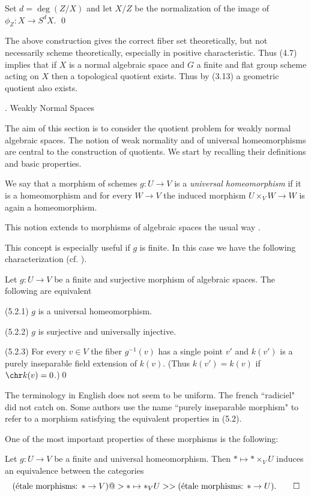 \demop Set  $d=\deg (Z/X)$ and let $X/Z$ be the normalization of the image of
$\phi_Z:X\to S^d X$. \qed\enddemo

 The above construction gives the correct fiber set
theoretically, but not necessarily scheme theoretically, especially in
positive characteristic. Thus (4.7) implies that if $X$ is a normal algebraic
space and $G$ a finite and flat group scheme acting on $X$ then a topological
quotient exists. Thus  by (3.13) a geometric quotient also exists.
\enddemo


. Weakly Normal Spaces
\endhead


The aim of this section is to consider the quotient problem for weakly normal
algebraic spaces. The notion of weak normality and of universal
homeomorphisms are central to the construction of quotients.  We start by
recalling their definitions and  basic properties.



 We say that a morphism of schemes $g:U\to V$ is a {\it
universal homeomorphism} if  it is a homeomorphism and for every $W\to V$ the
induced morphism $U\times_VW\to W$ is again a homeomorphism.

This notion extends to morphisms of algebraic spaces the usual way
\cite{Knutson71, II.3}.
\enddemo

This concept is especially useful if $g$ is finite. In this case we have the
following   characterization (cf.
\cite{EGA71, I.3.7--8}).

  Let $g:U\to V$ be a finite and surjective morphism of
algebraic spaces. The following are equivalent

(5.2.1) $g$ is  a universal homeomorphism.

(5.2.2) $g$ is surjective and universally injective.

(5.2.3) For every $v\in V$ the fiber  $g^{-1}(v)$ has a single
point $v'$ and
$k(v')$ is a purely inseparable field extension of   $k(v)$.
(Thus $k(v')=k(v)$ if $\chr k(v)=0$.)\qed
\endproclaim


 The terminology in English does not seem to be uniform.
The french ``radiciel" \cite{EGA71, I.3.7} did not catch on. Some authors use
the name ``purely inseparable morphism" to refer to a morphism satisfying the
equivalent properties in (5.2).
\enddemo

One of the most important properties of these morphisms is the following:

 \cite{SGA1, IX.4.10}  Let $g:U\to V$ be a finite and
universal homeomorphism. Then $\ast\mapsto \ast\times_VU$ induces an
equivalence between the categories
$$
(\text{\'etale morphisms: $\ast\to V$})
@>{\ast\mapsto \ast_VU}>>
(\text{\'etale morphisms: $\ast\to U$}).\qed
$$
\endproclaim

